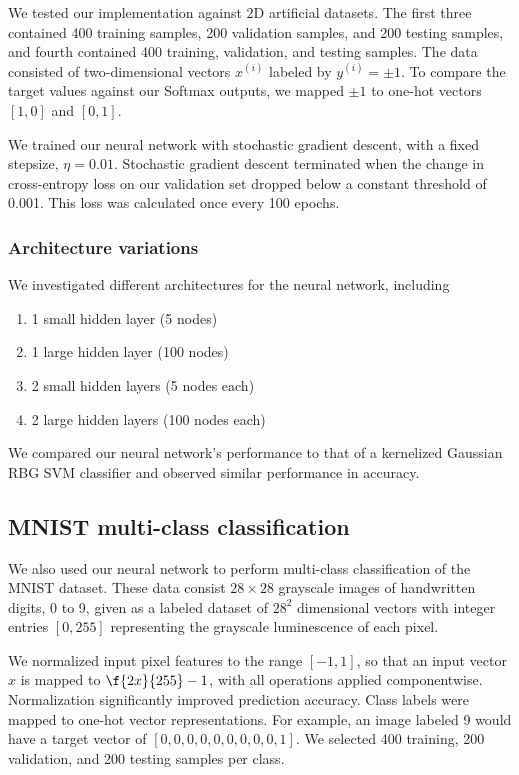 \documentclass{article}
\newcommand{\sind}[1]{^{(#1)}}
\begin{document}
\begin{multicols}{2}
We tested our implementation against 2D artificial datasets.
The first three contained 400 training samples,
200 validation samples,
and 200 testing samples, and fourth contained 
400 training, validation, and testing samples.
The data consisted of two-dimensional vectors $x\sind{i}$ labeled by $y\sind{i} = \pm1$.
To compare the target values against our Softmax outputs, we mapped $\pm1$ to
one-hot vectors $[1,0]$ and $[0,1]$.

We trained our neural network with stochastic gradient descent, with a 
fixed stepsize, $\eta = 0.01$. Stochastic gradient descent terminated when
the change in cross-entropy loss on our validation set dropped below a constant threshold of 0.001.
This loss was calculated once every 100 epochs.


\subsubsection{Architecture variations}
\label{subsubsec:binaryarch}
We investigated different architectures for the neural network, including
\begin{enumerate}
\item 1 small hidden layer (5 nodes)
\item 1 large hidden layer (100 nodes)
\item 2 small hidden layers (5 nodes each)
\item 2 large hidden layers (100 nodes each)
\end{enumerate}

We compared our neural network's performance to that of a kernelized
Gaussian RBG SVM classifier and observed similar performance in accuracy.

\subsection{MNIST multi-class classification}

We also used our neural network to perform multi-class classification of the
MNIST dataset. These data consist $28\times 28$ grayscale images of handwritten
digits, 0 to 9, given as a labeled dataset of $28^2$ dimensional vectors
with integer entries $[0,255]$ representing the grayscale luminescence of each pixel.

We normalized input pixel features to the range $[-1, 1]$,
so that an input vector $x$ is mapped to $\f{2x}{255}-1$,
with all operations applied componentwise. Normalization significantly
improved prediction accuracy. Class labels were mapped to one-hot vector 
representations. For example, an image labeled 9 would have a 
target vector of $[0,0,0,0,0,0,0,0,0,1]$.
We selected 400 training, 200 validation, and 200 testing samples per class.


\end{multicols}
\end{document}

